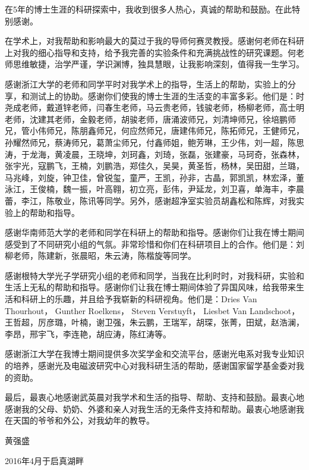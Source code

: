 \begin{thanks}
	
在5年的博士生涯的科研探索中，我收到很多人热心，真诚的帮助和鼓励。在此特别感谢。

在学术上，对我帮助和影响最大的莫过于我的导师何赛灵教授。感谢何老师在科研上对我的细心指导和支持，给予我完善的实验条件和充满挑战性的研究课题。何老师思维敏捷，治学严谨，学识渊博，独具慧眼，让我影响深刻，值得我一生学习。

感谢浙江大学的老师和同学平时对我学术上的指导，生活上的帮助，实验上的分享，和测试上的协助。感谢你们使我的博士生涯的生活变的丰富多彩。他们是：时尧成老师，戴道锌老师，闫春生老师，马云贵老师，钱骏老师，杨柳老师，高士明老师，沈建其老师，金毅老师，胡骏老师，唐涌波师兄，刘清坤师兄，徐培鹏师兄，管小伟师兄，陈朋鑫师兄，何应然师兄，唐建伟师兄，陈拓师兄，王健师兄，孙耀然师兄，蔡涛师兄，葛萧尘师兄，付鑫师姐，鲍芳琳，王少伟，刘一超，陈思涛，于龙海，黄凌晨，王晓坤，刘珂鑫，刘琦，张磊，张建豪，马珂奇，张森林，张宇光，寇鹏飞，王楠，刘鹏浩，郑佳久，吴昊，黄圣哲，杨林，吴田甜，兰璐，马兆峰，刘旋，钟卫佳，曾锐玺，童严，王凯，孙非，古晶，郭凯凯，林宏泽，董泳江，王俊楠，魏一振，叶高翱，初立亮，彭伟，尹延龙，刘卫喜，单海丰，李晨蕾，李江，陈敬业，陈讯等同学。另外，感谢超净室实验员胡鑫松和陈辉，对我实验上的帮助和指导。

感谢华南师范大学的老师和同学在科研上的帮助和指导。感谢你们让我在博士期间感受到了不同研究小组的气氛。非常珍惜和你们在科研项目上的合作。他们是：刘柳老师，陈建新，张晨昭，朱云涛，陈楷旋等同学。

感谢根特大学光子学研究小组的老师和同学，当我在比利时时，对我科研，实验和生活上无私的帮助和指导。感谢你们让我在博士期间体验了异国风味，给我带来生活和科研上的乐趣，并且给予我崭新的科研视角。他们是：Dries Van Thourhout， Gunther Roelkens， Steven Verstuyft， Liesbet Van Landschoot， 王哲超，厉彦璐，叶楠，谢卫强，朱云鹏，王瑞军，胡琛，张菁，田斌，赵浩澜，李昂，邢宇飞，李连艳，胡应涛，陈红涛等。

感谢浙江大学在我博士期间提供多次奖学金和交流平台，感谢光电系对我专业知识的培养，感谢光及电磁波研究中心对我科研生活的帮助，感谢国家留学基金委对我的资助。

最后，最衷心地感谢武英晨对我学术和生活的指导、帮助、支持和鼓励。最衷心地感谢我的父母、奶奶、外婆和亲人对我生活的无条件支持和帮助。最衷心地感谢我在天国的爷爷和外公，对我幼年的教导。

\begin{flushright}
	黄强盛
	
	2016年4月于启真湖畔
\end{flushright}

\end{thanks}
